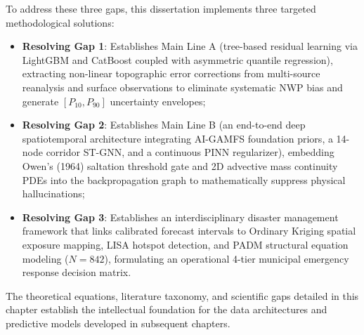 To address these three gaps, this dissertation implements three targeted methodological solutions:
\begin{itemize}
    \item \textbf{Resolving Gap 1}: Establishes Main Line A (tree-based residual learning via LightGBM and CatBoost coupled with asymmetric quantile regression), extracting non-linear topographic error corrections from multi-source reanalysis and surface observations to eliminate systematic NWP bias and generate $[P_{10}, P_{90}]$ uncertainty envelopes;
    \item \textbf{Resolving Gap 2}: Establishes Main Line B (an end-to-end deep spatiotemporal architecture integrating AI-GAMFS foundation priors, a 14-node corridor ST-GNN, and a continuous PINN regularizer), embedding Owen's (1964) saltation threshold gate and 2D advective mass continuity PDEs into the backpropagation graph to mathematically suppress physical hallucinations;
    \item \textbf{Resolving Gap 3}: Establishes an interdisciplinary disaster management framework that links calibrated forecast intervals to Ordinary Kriging spatial exposure mapping, LISA hotspot detection, and PADM structural equation modeling ($N=842$), formulating an operational 4-tier municipal emergency response decision matrix.
\end{itemize}

The theoretical equations, literature taxonomy, and scientific gaps detailed in this chapter establish the intellectual foundation for the data architectures and predictive models developed in subsequent chapters.
